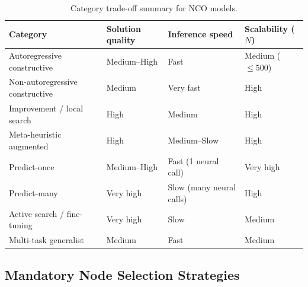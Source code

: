 \documentclass{article}
\begin{document}
\begin{table}[H]
    \centering
    \caption{Category trade-off summary for NCO models.}
    \begin{tabularx}{\textwidth}{@{} X l l l @{}}
        \toprule
        \textbf{Category} & \textbf{Solution quality} & \textbf{Inference speed} & \textbf{Scalability ($N$)} \\
        \midrule
        Autoregressive constructive & Medium--High & Fast & Medium ($\le 500$) \\
        Non-autoregressive constructive & Medium & Very fast & High \\
        Improvement / local search & High & Medium & High \\
        Meta-heuristic augmented & High & Medium--Slow & High \\
        Predict-once & Medium--High & Fast (1 neural call) & Very high \\
        Predict-many & Very high & Slow (many neural calls) & High \\
        Active search / fine-tuning & Very high & Slow & Medium \\
        Multi-task generalist & Medium & Fast & Medium \\
        \bottomrule
    \end{tabularx}
\end{table}


\subsection*{Mandatory Node Selection Strategies}
\end{document}
